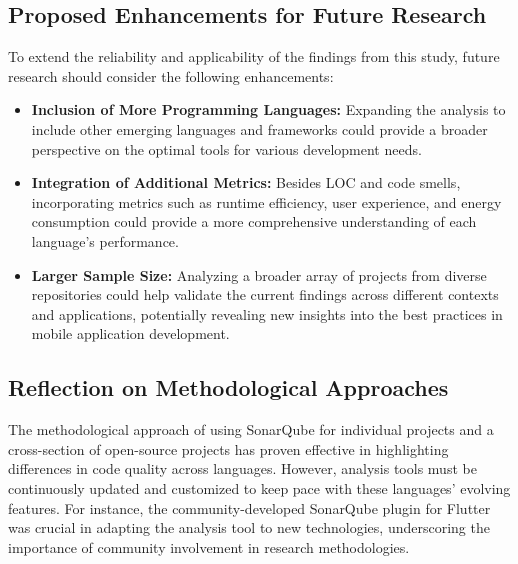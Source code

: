 \subsection{Proposed Enhancements for Future Research}
To extend the reliability and applicability of the findings from this study, future research should consider the following enhancements:
\begin{itemize}
    \item \textbf{Inclusion of More Programming Languages:} Expanding the analysis to include other emerging languages and frameworks could provide a broader perspective on the optimal tools for various development needs.
    \item \textbf{Integration of Additional Metrics: }Besides LOC and code smells, incorporating metrics such as runtime efficiency, user experience, and energy consumption could provide a more comprehensive understanding of each language's performance.
    \item \textbf{Larger Sample Size: }Analyzing a broader array of projects from diverse repositories could help validate the current findings across different contexts and applications, potentially revealing new insights into the best practices in mobile application development.
\end{itemize}
\subsection{Reflection on Methodological Approaches}
The methodological approach of using SonarQube for individual projects and a cross-section of open-source projects has proven effective in highlighting differences in code quality across languages. However, analysis tools must be continuously updated and customized to keep pace with these languages' evolving features. For instance, the community-developed SonarQube plugin for Flutter was crucial in adapting the analysis tool to new technologies, underscoring the importance of community involvement in research methodologies.